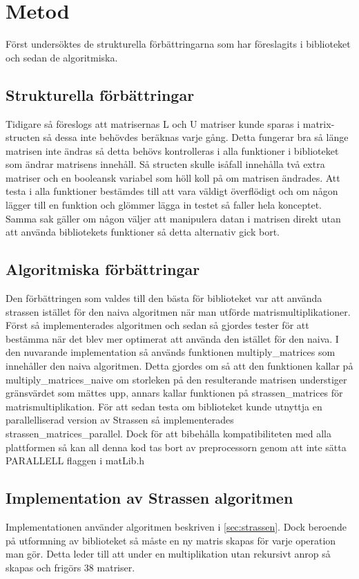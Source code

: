 \section{Metod}
Först undersöktes de strukturella förbättringarna som har föreslagits i biblioteket och sedan de algoritmiska.
\subsection{Strukturella förbättringar}
Tidigare så föreslogs att matrisernas L och U matriser kunde sparas i matrix-structen så dessa inte behövdes beräknas varje gång. Detta fungerar bra så länge matrisen inte ändras så detta behövs kontrolleras i alla funktioner i biblioteket som ändrar matrisens innehåll. Så structen skulle isåfall innehålla två extra matriser och en booleansk variabel som höll koll på om matrisen ändrades. Att testa i alla funktioner bestämdes till att vara väldigt överflödigt och om någon lägger till en funktion och glömmer lägga in testet så faller hela konceptet. Samma sak gäller om någon väljer att manipulera datan i matrisen direkt utan att använda bibliotekets funktioner så detta alternativ gick bort.

\subsection{Algoritmiska förbättringar}
Den förbättringen som valdes till den bästa för biblioteket var att använda strassen istället för den naiva algoritmen när man utförde matrismultiplikationer. Först så implementerades algoritmen och sedan så gjordes tester för att bestämma när det blev mer optimerat att använda den istället för den naiva. I den nuvarande implementation så används funktionen multiply\_matrices som innehåller den naiva algoritmen. Detta gjordes om så att den funktionen kallar på multiply\_matrices\_naive om storleken på den resulterande matrisen understiger gränsvärdet som mättes upp, annars kallar funktionen på strassen\_matrices för matrismultiplikation. 
\newline
\newline
För att sedan testa om biblioteket kunde utnyttja en parallelliserad version av Strassen så implementerades  strassen\_matrices\_parallel. Dock för att bibehålla kompatibiliteten med alla plattformen så kan all denna kod tas bort av preprocessorn genom att inte sätta PARALLELL flaggen i matLib.h
\subsection{Implementation av Strassen algoritmen}
Implementationen använder algoritmen beskriven i \ref{sec:strassen}. Dock beroende på utformning av biblioteket så måste en ny matris skapas för varje operation man gör. Detta leder till att under en multiplikation utan rekursivt anrop så skapas och frigörs 38 matriser. 

